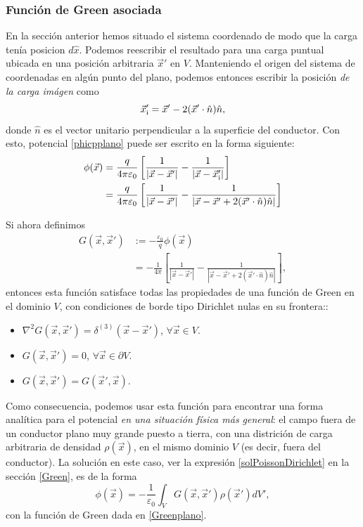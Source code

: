 \subsubsection{Función de Green asociada}
En la sección anterior hemos situado el sistema coordenado de modo que la carga tenía posicion $d\hat{x}$. Podemos reescribir el resultado para una carga puntual ubicada en una posición arbitraria $\vec{x}'$ en $V$. Manteniendo el origen del sistema de coordenadas en algún punto del plano, podemos entonces escribir la posición \textit{de la carga imágen} como
\begin{equation}
\vec{x}'_{\rm i} = \vec{x}'-2(\vec{x}'\cdot\hat{n})\hat{n},
\end{equation}
donde $\hat{n}$ es el vector unitario perpendicular a la superficie del conductor. Con esto, potencial \eqref{phicpplano} puede ser escrito en la forma siguiente:
\begin{align}
\phi(\vec{x}) &= \frac{q}{4\pi\varepsilon_0}\left[\frac{1}{\left|\vec{x}-\vec{x}'\right|}-\frac{1}{\left|\vec{x}-\vec{x}'_{\rm i}\right|}\right] \\
&= \frac{q}{4\pi\varepsilon_0}\left[\frac{1}{\left|\vec{x}-\vec{x}'\right|}-\frac{1}{\left|\vec{x}-\vec{x}'+2(\vec{x}'\cdot\hat{n})\hat{n}\right|}\right]
\end{align}

Si ahora definimos
\begin{align}
G(\vec{x},\vec{x}') &:= -\frac{\varepsilon_0}{q}\phi(\vec{x}) \\
&= -\frac{1}{4\pi}\left[\frac{1}{\left|\vec{x}-\vec{x}'\right|}-\frac{1}{\left|\vec{x}-\vec{x}'+2(\vec{x}'\cdot\hat{n})\hat{n}\right|}\right], \label{Greenplano}
\end{align}
entonces esta función satisface todas las propiedades de una función de Green en el dominio $V$, con condiciones de borde tipo Dirichlet nulas en su frontera::
\begin{itemize}
\item $\nabla^2G(\vec{x},\vec{x}')=\delta^{(3)}(\vec{x}-\vec{x}')$, $\forall \vec{x}\in V$.
\item $G(\vec{x},\vec{x}')=0$, $\forall \vec{x}\in \partial V$.
\item $G(\vec{x},\vec{x}')=G(\vec{x}',\vec{x})$.
\end{itemize}

Como consecuencia, podemos usar esta función para encontrar una forma analítica para el potencial \textit{en una situación física más general}: el campo fuera de un conductor plano muy grande puesto a tierra, con una districión de carga arbitraria de densidad $\rho(\vec{x})$, en el mismo dominio $V$ (es decir, fuera del conductor). La solución en este caso, ver la expresión \ref{solPoissonDirichlet} en la sección \ref{Green}, es de la forma
\begin{equation}
\phi(\vec{x}) = -\frac{1}{\varepsilon_0}\int_VG(\vec{x},\vec{x}') \rho(\vec{x}')dV',
\end{equation}
con la función de Green dada en \ref{Greenplano}.

